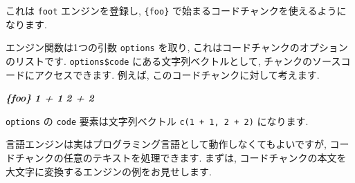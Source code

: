 \documentclass[
  11pt,
]{bxjsreport}
\newenvironment{Shaded}{\begin{snugshade}}{\end{snugshade}}
\newcommand{\AttributeTok}[1]{\textcolor[rgb]{0.77,0.63,0.00}{#1}}
\newcommand{\CommentTok}[1]{\textcolor[rgb]{0.56,0.35,0.01}{\textit{#1}}}
\newcommand{\ControlFlowTok}[1]{\textcolor[rgb]{0.13,0.29,0.53}{\textbf{#1}}}
\newcommand{\FunctionTok}[1]{\textcolor[rgb]{0.00,0.00,0.00}{#1}}
\newcommand{\InformationTok}[1]{\textcolor[rgb]{0.56,0.35,0.01}{\textbf{\textit{#1}}}}
\newcommand{\NormalTok}[1]{#1}
\newcommand{\OtherTok}[1]{\textcolor[rgb]{0.56,0.35,0.01}{#1}}
\newcommand{\SpecialCharTok}[1]{\textcolor[rgb]{0.00,0.00,0.00}{#1}}
\newcommand{\StringTok}[1]{\textcolor[rgb]{0.31,0.60,0.02}{#1}}
\begin{document}
\begin{Shaded}
\end{Shaded}

これは \texttt{foot} エンジンを登録し, \texttt{\textasciigrave{}\textasciigrave{}\textasciigrave{}\{foo\}} で始まるコードチャンクを使えるようになります.

エンジン関数は1つの引数 \texttt{options} を取り, これはコードチャンクのオプションのリストです. \texttt{options\$code} にある文字列ベクトルとして, チャンクのソースコードにアクセスできます. 例えば, このコードチャンクに対して考えます.

\begin{Shaded}
\begin{Highlighting}[]
\InformationTok{\textasciigrave{}\textasciigrave{}\textasciigrave{}\{foo\}}
\InformationTok{1 + 1}
\InformationTok{2 + 2}
\InformationTok{\textasciigrave{}\textasciigrave{}\textasciigrave{}}
\end{Highlighting}
\end{Shaded}

\texttt{options} の \texttt{code} 要素は文字列ベクトル \texttt{c(\textquotesingle{}1\ +\ 1\textquotesingle{},\ \textquotesingle{}2\ +\ 2\textquotesingle{})} になります.

言語エンジンは実はプログラミング言語として動作しなくてもよいですが, コードチャンクの任意のテキストを処理できます. まずは, コードチャンクの本文を大文字に変換するエンジンの例をお見せします.

\begin{Shaded}
\end{Shaded}
\end{document}
